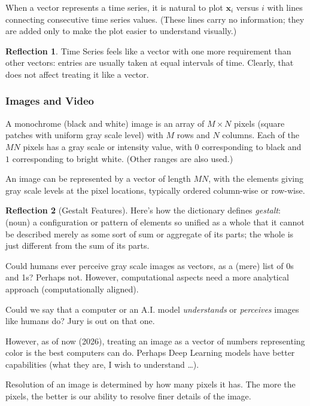 \documentclass[11pt]{book}
\theoremstyle{definition}
\theoremstyle{plain}
\theoremstyle{problemstyle}
\theoremstyle{remark}
\theoremstyle{definition}
\newtheorem{reflection}{Reflection}
\begin{document}
When a vector represents a time series, it is natural to plot $\boldsymbol{x}_i$ versus $i$ with lines connecting consecutive time series values. (These lines carry no information; they are added only to make the plot easier to understand visually.) 

\begin{reflection}
    Time Series feels like a vector with one more requirement than other vectors: entries are usually taken at equal intervals of time. Clearly, that does not affect treating it like a vector.
\end{reflection}


\subsubsection*{Images and Video}
A monochrome (black and white) image is an array of $M\times N$ pixels (square patches with uniform gray scale level) with $M$ rows and $N$ columns. Each of the $MN$ pixels has a gray scale or intensity value, with $0$ corresponding to black and $1$ corresponding to bright white. (Other ranges are also used.) 

An image can be represented by a vector of length $MN$, with the elements giving gray scale levels at the pixel locations, typically ordered column-wise or row-wise.

\begin{reflection}[Gestalt Features]
    Here's how the dictionary defines \emph{gestalt}: (noun) a configuration or pattern of elements so unified as a whole that it cannot be described merely as some sort of sum or aggregate of its parts; the whole is just different from the sum of its parts.

    Could humans ever perceive gray scale images as vectors, as a (mere) list of 0s and 1s? Perhaps not. However, computational aspects need a more analytical approach (computationally aligned). 

    Could we say that a computer or an A.I. model \emph{understands} or \emph{perceives} images like humans do? Jury is out on that one. 

    However, as of now (2026), treating an image as a vector of numbers representing color is the best computers can do. Perhaps Deep Learning models have better capabilities (what they are, I wish to understand \dots). 

\end{reflection}

Resolution of an image is determined by how many pixels it has. The more the pixels, the better is our ability to resolve finer details of the image.
\end{document}
